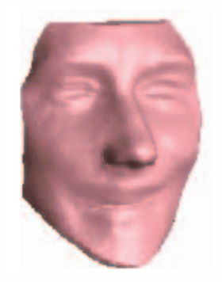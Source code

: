 \begin{figure}
\begin{subfigure}{0.23\textwidth}
        \includegraphics[width=\textwidth]{statistical_normals/images/kemelmacher_borrowed/hanks_depth}
\label{fig:tom-hanks-kemelmacher}
    \end{subfigure}
    \\
    \begin{subfigure}{0.23\textwidth}
        \centering

\end{subfigure}
\end{figure}
